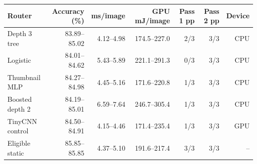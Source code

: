 \begin{tabular}{@{}lrrrrrr@{}}
\toprule
Router & Accuracy (\%) & ms/image & GPU mJ/image & Pass 1 pp & Pass 2 pp & Device\\
\midrule
Depth 3 tree & 83.89--85.02 & 4.12--4.98 & 174.5--227.0 & 2/3 & 3/3 & CPU\\
Logistic & 84.01--84.62 & 5.43--5.89 & 221.1--291.3 & 0/3 & 3/3 & CPU\\
Thumbnail MLP & 84.27--84.98 & 4.45--5.16 & 171.6--220.8 & 1/3 & 3/3 & CPU\\
Boosted depth 2 & 84.19--85.01 & 6.59--7.64 & 246.7--305.4 & 1/3 & 3/3 & CPU\\
TinyCNN control & 84.50--84.91 & 4.15--4.46 & 171.4--235.4 & 1/3 & 3/3 & GPU\\
Eligible static & 85.85--85.85 & 4.37--5.10 & 191.6--217.4 & 3/3 & 3/3 & --\\
\bottomrule
\end{tabular}